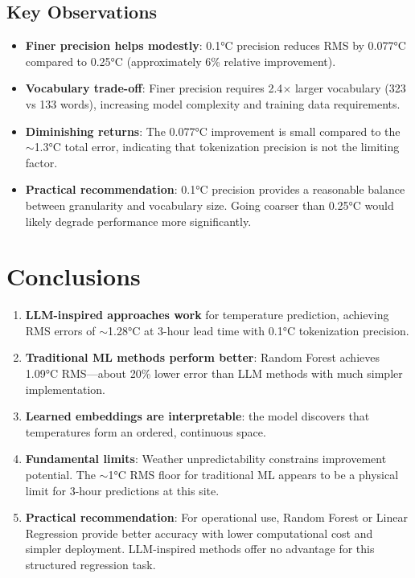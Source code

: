 \documentclass[11pt]{article}
\begin{document}
\subsection{Key Observations}

\begin{itemize}
    \item \textbf{Finer precision helps modestly}: 0.1°C precision reduces RMS by 0.077°C compared to 0.25°C (approximately 6\% relative improvement).

    \item \textbf{Vocabulary trade-off}: Finer precision requires 2.4$\times$ larger vocabulary (323 vs 133 words), increasing model complexity and training data requirements.

    \item \textbf{Diminishing returns}: The 0.077°C improvement is small compared to the $\sim$1.3°C total error, indicating that tokenization precision is not the limiting factor.

    \item \textbf{Practical recommendation}: 0.1°C precision provides a reasonable balance between granularity and vocabulary size. Going coarser than 0.25°C would likely degrade performance more significantly.
\end{itemize}

\section{Conclusions}

\begin{enumerate}
    \item \textbf{LLM-inspired approaches work} for temperature prediction, achieving RMS errors of $\sim$1.28°C at 3-hour lead time with 0.1°C tokenization precision.

    \item \textbf{Traditional ML methods perform better}: Random Forest achieves 1.09°C RMS---about 20\% lower error than LLM methods with much simpler implementation.

    \item \textbf{Learned embeddings are interpretable}: the model discovers that temperatures form an ordered, continuous space.

    \item \textbf{Fundamental limits}: Weather unpredictability constrains improvement potential. The $\sim$1°C RMS floor for traditional ML appears to be a physical limit for 3-hour predictions at this site.

    \item \textbf{Practical recommendation}: For operational use, Random Forest or Linear Regression provide better accuracy with lower computational cost and simpler deployment. LLM-inspired methods offer no advantage for this structured regression task.
\end{enumerate}
\end{document}
